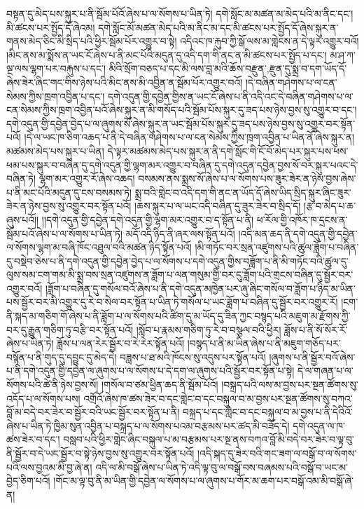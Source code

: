 བསྟན་དུ་མེད་པས་སྐུར་པ་ནི་སྦོམ་པོའོ་ཞེས་པ་ལ་སོགས་པ་ཡིན་ཏེ། དགེ་སློང་མ་མཚན་མ་མེད་པའི་མ་ནིང་དང་། མི་ཚངས་པར་སྤྱོད་དོ་ཞེའམ། དགེ་སློང་མོ་མཚན་མེད་པའི་མ་ནིང་མ་དང་མི་ཚངས་པར་སྤྱོད་དོ་ཞེས་སྐུར་ན་གནས་མེད་ཅིང་མི་སྲིད་པའི་ཕྱིར་སྦོམ་པོར་འགྱུར་བ་སྟེ། འདིའང་ཁ་རྐུབ་ཀྱི་སྒོ་ལས་མ་གླེངས་ན་དེ་ལྟར་འགྱུར་བའོ། །མིང་ནས་མ་སྨོས་ན་ཡང་ངོ་ཞེས་པ་ནི་མང་པོའི་མདུན་དུ་འདི་དག་གི་ནང་ན་མི་ཚངས་པར་སྤྱོད་པ་དང་། མ་ཤ་ཀ་ལྔ་ལས་ལྷག་པར་བརྐུས་པ་དང་། མིའི་སྲོག་བཅད་པ་དང་མི་ལས་བླ་མའི་ཆོས་{བརྫུན་,རྫུན་}དུ་སྨྲ་བ་དག་ཡོད་དོ་ཞེས་ཟེར་ཞིང་གང་གིས་ཉེས་པའི་མིང་ནས་མི་འབྱིན་ན་སྦོམ་པོར་འགྱུར་བའོ། །དེ་བཞིན་གཤེགས་པ་ལ་ངན་སེམས་ཀྱིས་ཁྲག་འབྱིན་པ་དང་། དགེ་འདུན་གྱི་དབྱེན་གྱིས་ན་ཡང་ངོ་ཞེས་པ་ནི་འདི་འང་དེ་བཞིན་གཤེགས་པ་ལ་ངན་སེམས་ཀྱིས་ཁྲག་འབྱིན་པའོ་ཞེས་སྐུར་ན་མི་གསོད་པའི་སྦོམ་པོས་སྐུར་དུ་ཟད་པས་ཉེས་བྱས་སུ་འགྱུར་བ་དང་། དགེ་འདུན་གྱི་དབྱེན་བྱེད་པ་ལ་ཞུགས་སོ་ཞེས་སྐུར་ན་ཡང་སྦོམ་པོས་སྐུར་དུ་ཟད་པས་ཉེས་བྱས་སུ་འགྱུར་བར་སྟོན་པའོ། །དེ་ལ་ཡང་ཁ་ཅིག་འཆད་པ་ནི་དེ་བཞིན་གཤེགས་པ་ལ་ངན་སེམས་ཀྱིས་ཁྲག་འབྱིན་པ་ཡིན་ནོ་ཞེས་སྐུར་ན། མཚམས་མེད་པས་སྐུར་པ་ཡིན། དེ་ལྟར་མཚམས་མེད་པས་སྐུར་ན་ནི་དགེ་སློང་གི་ངོ་བོ་མེད་པར་སྐུར་པས་ཕས་ཕམ་པས་སྐུར་བ་བཞིན་དུ་དགེ་འདུན་གྱི་ལྷག་མར་འགྱུར་བ་བཞིན་དུ་དགེ་འདུན་དབྱེན་བྱས་སོ་བར་སྐུར་པའང་དེ་བཞིན་ཏེ། ལྷག་མར་འགྱུར་རོ་ཞེས་འཆད། བསམས་ནས་སྨྲས་སོ་ཞེས་པ་ལ་སོགས་པས་ཟུར་ཟེར་ན་ཉེས་བྱས་ཞེས་པ་ནི་མང་པོའི་མདུན་དུ་ངས་བསམས་ཏེ། སྨྲ་བའི་གླེང་བ་འདི་དག་གི་ནང་ན་ཡོད་དོ་ཞེས་ཡིད་སྲིད་སྐུར་ཞིང་ཟུར་ཟེར་ན་ཉེས་བྱས་སུ་འགྱུར་བར་སྟོན་པའོ། །ཆས་སྐུར་པ་ལ་ཡང་འདི་བཞིན་དུ་ཟུར་ཟེར་བ་སྲིད་དོ། །རྩ་བ་མེད་པ་ཆ་ཞུས་པའོ།། །།དགེ་འདུན་གྱི་དབྱེན་དགེ་འདུན་གྱི་ལྷག་མར་འགྱུར་བ་ད་སྟོན་པ་ནི། ཕ་རོལ་གྱི་འཁོར་ཁ་དྲངས་ན་སྦོམ་པའོ་ཞེས་པ་ལ་སོགས་པ་ཡིན་ཏེ། མདོ་འདི་ཉིད་ནི་ཞར་ལས་སྟོན་པའོ། །འདི་མན་ཆད་ནི་དགེ་འདུན་གྱི་དབྱེན་ལ་སོགས་ལྷག་མ་བཞི་ཁོང་འཐུལ་བའི་མཚན་ཉིད་སྟོན་པའོ། །མི་གཏོང་བར་སྲན་འཛུགས་པའི་ཚུལ་ཟློག་པ་བཞིན་དུ་བསྡེབ་ཅེས་པ་ནི་དགེ་འདུན་གྱི་དབྱེན་བྱེད་པ་ལ་སོགས་པ་དགེ་འདུན་གྱིས་བཟློག་པ་ནི་མི་གཏོང་བའི་ཚུལ་དུ་ལུས་སམ་ངག་གམ་མི་སྨྲ་བས་སྲན་འཛུགས་ན་ཟློག་པ་ལན་གསུམ་གྱི་བར་དུ་ཟློག་པའི་གྲངས་བཞིན་དུ་སྦྱོར་བར་འགྱུར་བའོ། །ཟློག་པ་བཞིན་དུ་གསོལ་བའོ་ཞེས་པ་ནི་དགེ་འདུན་མཁྱེན་པར་ཞུ་ཞིང་གསོལ་བ་ཟློག་པ་ཉིད་མ་ཡིན་པས་སྦྱོར་བར་མི་འགྱུར་དུ་རེ་བ་སེལ་བར་སྟོན་པ་ཡིན་ཏེ་གསོལ་པ་ཡང་ཟློག་པ་བཞིན་དུ་སྦྱོར་བར་འགྱུར་རོ། །ངག་ནི་སྐད་མ་གཅིག་གོ་ཞེས་པ་ནི་ཟློག་པ་ལ་སོགས་པའི་ཚིག་དུ་མ་ཡོད་དུ་ཟིན་ཀྱང་བསྙད་པའི་མཇུག་མ་རྫོགས་ཀྱི་བར་དུ་རྒྱུན་གཅིག་ཏུ་བརྩི་བར་སྟོན་པའོ། །སློབ་པ་རྣམས་གཅིག་ཏུ་རེ་བ་བསྩལ་བའི་ཕྱིར། ཟློས་པ་ནི་སོ་སོར་རོ་ཞེས་པ་ཡིན་ཏེ། ཟློས་པ་ལན་རེར་སྦྱོར་བ་རེ་རེར་སྟོན་པའོ། །བསྙད་པ་ནི་མ་ཡིན་ཞེས་པ་ནི་མཇུག་གཅོད་པར་བསྙོན་པ་ནི་གུད་དུ་དབྱུང་དུ་མེད་དེ། བཟླས་པ་ཐ་མའི་ཁོངས་སུ་འདུས་པར་སྟོན་པའོ། །ཞུགས་པ་ནི་སྦྱོར་བའོ་ཞེས་པ་ནི་དགེ་འདུན་གྱི་དབྱེན་ལ་ཞུགས་པ་ལ་སོགས་པ་དེ་དག་ལ་ཞུགས་པའི་སྦྱོར་བར་སྟོན་པ་སྟེ། དེ་ལ་གཞན་པ་ལ་སོགས་པའི་ཚེ་ནི་ཉེས་བྱས་སོ། །གསོལ་བ་ཙམ་ཕྱིན་ཆད་ནི་སྦོམ་པོའོ། །བསྐྲད་པའི་ལས་མ་བྱས་པར་སྔན་ཚོགས་སུ་འདོད་པ་ལ་སོགས་པས། འགྲོའོ་ཞེས་ཁ་ཚས་ཟེར་བ་དང་གླེང་བ་དང་བསྐུལ་བ་མ་བྱས་པར་སྔན་ཚོགས་སུ་བཀའ་བློ་མ་བདེ་བར་ཟེར་བ་སྦྱོར་བའི་ཡང་སྦྱོར་བར་སྟོན་པ་ནི། བསྐྲད་པ་དང་གླེང་བ་དང་བསྐུལ་བ་མ་བྱས་པ་ནི་དེའིའོ་ཞེས་པ་ཡིན་ཏེ་ཁྱིམ་སུན་འབྱིན་པ་བསྐྲད་པ་ལ་སོགས་པའམ་བརྩམས་པར་ཚད་མི་བཟོད་དེ། དགེ་འདུན་ལ་ཁ་ཚས་ཟེར་བ་དང་། བསླབ་པའི་ཕྱིར་གླེང་ཞིང་བསྐུལ་པ་མ་བརྩམས་པར་སྔ་ནས་བཀའ་བློ་མི་བདེ་བར་ཟེར་བ་ལྟ་བུ་ནི་སྦྱོར་བ་དེ་ཡང་སྦྱོར་བ་སྟེ་ཉེས་བྱས་སུ་འགྱུར་བར་སྟོན་པའོ། །འདི་སྐད་དུ་ཟེར་བའི་གང་ཟག་ལ་བསྒོ་བ་ལ་སོགས་པའི་ལས་བྱའམ་མི་བྱ་ཞེ་ན། འདི་ལ་མི་བསྒོ་ཞེས་པ་ཡིན་ཏེ་འདི་ལྟ་བུ་ལ་བསྒོ་བས་བཞམས་པའི་བསྒོ་བ་ཡང་མ་བྱེད་ཅིག་པའོ། །གོང་མ་ལྟ་བུ་ནི་མ་ཡིན་གྱི་དབྱེན་ལ་སོགས་པ་ལ་ཞུགས་པ་གོར་མ་ཆག་པར་བསྒོ་འམ་མི་བསྒོ་ཞེ་ན། 